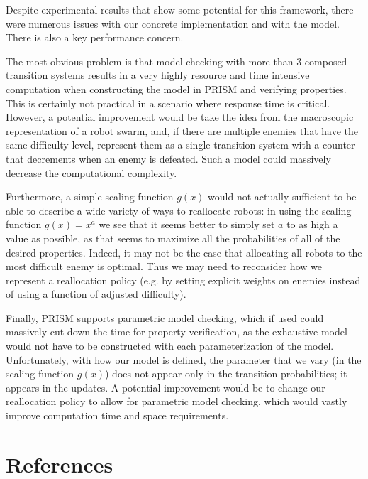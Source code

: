 \documentclass[11pt]{article}
\theoremstyle{definition}
\begin{document}
Despite experimental results that show some potential for this framework,
there were numerous issues with our concrete implementation
and with the model. There is also a key performance concern.

The most obvious problem is that model checking
with more than 3 composed transition systems results
in a very highly resource and time intensive computation
when constructing the model in PRISM and verifying
properties. This is certainly not practical in a
scenario where response time is critical. However,
a potential improvement would be take the idea from
the macroscopic representation of a robot swarm,
and, if there are multiple enemies that have the same
difficulty level, represent them as a single transition
system with a counter that decrements when
an enemy is defeated. Such a model
could massively decrease the computational
complexity.

Furthermore, a simple scaling function $ g(x) $
would not actually sufficient to be able to
describe a wide variety of ways to reallocate
robots: in using the scaling function $ g(x) = x^a $
we see that it seems better to simply set
$ a $ to as high a value as possible, as that
seems to maximize all the probabilities of all
of the desired properties. Indeed, it may not be the
case that allocating all robots to the most
difficult enemy is optimal. Thus we may need
to reconsider how we represent a reallocation policy
(e.g. by setting explicit weights on enemies
instead of using a function of adjusted difficulty).

Finally, PRISM supports parametric model checking,
which if used could massively cut down the
time for property verification, as the exhaustive
model would not have to be constructed with
each parameterization of the model. Unfortunately,
with how our model is defined, the parameter
that we vary (in the scaling function $ g(x) $)
does not appear only in the transition probabilities;
it appears in the updates. A potential improvement
would be to change our reallocation policy to
allow for parametric model checking, which
would vastly improve computation time and
space requirements.

\section{References}
\end{document}
